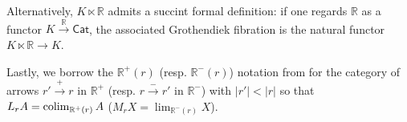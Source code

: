 \documentclass[a4paper,10pt
 ,draft
]{article}%
\begin{document}
Alternatively, $K \ltimes \mathbb{R}$
admits a succint formal definition: 
if one regards $\mathbb{R}$ as a
functor $%
 K \xrightarrow{\mathbb{R}} \mathsf{Cat}$, 
 the associated Grothendiek fibration is the natural functor $K \ltimes \mathbb{R} \to K$.%






Lastly, we borrow the $\mathbb{R}^+(r)$ (resp. $\mathbb{R}^-(r)$) notation from \cite{BM11} for
the category of arrows
$r' \xrightarrow{+} r$ in $\mathbb{R}^+$
(resp. 
$r \xrightarrow{-} r'$ in $\mathbb{R}^-$)
with $|r'|<|r|$
so that
$L_r A = \mathop{\operatorname{colim}}_{\mathbb{R}^+(r)}A$
($M_r X = \mathop{\lim}_{\mathbb{R}^-(r)}X$).
\end{document}
